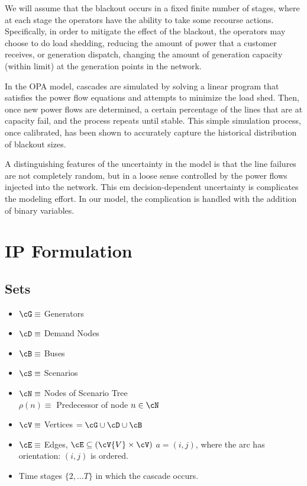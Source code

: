 We will assume that the blackout occurs in a fixed finite number of
stages, where at each stage the operators have the ability to take
some recourse actions.  Specifically, in order to mitigate the effect
of the blackout, the operators may choose to do
load shedding, reducing the amount of power that a customer
receives, or  generation dispatch, changing the amount of
generation capacity (within limit) at the generation points in the
network. 


In the OPA model, cascades are simulated by
solving a linear program that satisfies the power flow equations and
attempts to minimize the load shed.  Then, once new power flows are
determined, a certain percentage of the lines that are at capacity
fail, and the process repeats until stable.  This simple simulation
process, once calibrated, has been shown to accurately capture the
historical distribution of blackout sizes.

A distinguishing features of the uncertainty in the model is that the
line failures are not completely random, but in a loose sense controlled
by the power flows injected into the network.  This em
  decision-dependent uncertainty is complicates the modeling effort.
In our model, the complication is handled with the addition of binary
variables.




\section{IP Formulation}

\subsection{Sets}

\begin{itemize}
\item $ \cG \equiv $ Generators 
\item $ \cD \equiv $ Demand Nodes 
\item $ \cB \equiv $ Buses 
\item $ \cS \equiv $ Scenarios 
\item $ \cN \equiv $ Nodes of Scenario Tree\\
	$\rho \left( n \right) \equiv $ Predecessor of node $ n \in \cN $
\item $ \cV \equiv $ Vertices $ = \cG \cup \cD \cup \cB $
\item $ \cE \equiv $ Edges, $ \cE \subseteq (\cV{V} \times \cV )$\newline
	$  a = ( i , j )  $,  where the arc has orientation: $(i,j)$ is ordered. 
\item Time stages $\{2,\ldots T\}$ in which the cascade occurs.
\end{itemize}





